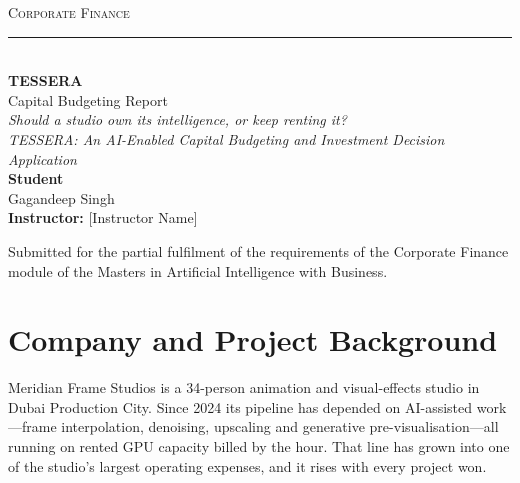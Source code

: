 \documentclass[11pt,a4paper]{article}
\begin{document}
\begin{titlepage}
\thispagestyle{empty}
\centering
\vspace*{2.6cm}

{\scshape\large Corporate Finance}\\[0.5em]
\rule{0.62\textwidth}{0.4pt}\\[2.4cm]

{\Huge\bfseries TESSERA}\\[1.0em]

{\large Capital Budgeting Report}\\[0.6em]

{\itshape Should a studio own its intelligence, or keep renting it?}\\[2.2cm]

{\itshape TESSERA: An AI-Enabled Capital Budgeting and Investment
Decision Application}\\[2.6cm]

{\bfseries Student}\\[0.7em]
Gagandeep Singh\\[2.0cm]

{\bfseries Instructor:} [Instructor Name]

\vfill

{\footnotesize Submitted for the partial fulfilment of the requirements of the
Corporate Finance module of the Masters in Artificial Intelligence with
Business.}

\vspace*{0.8cm}
\end{titlepage}

\tableofcontents
\newpage

\section{Company and Project Background}

Meridian Frame Studios is a 34-person animation and visual-effects studio in
Dubai Production City. Since 2024 its pipeline has depended on AI-assisted
work---frame interpolation, denoising, upscaling and generative
pre-visualisation---all running on rented GPU capacity billed by the hour. That
line has grown into one of the studio's largest operating expenses, and it rises
with every project won.
\end{document}
